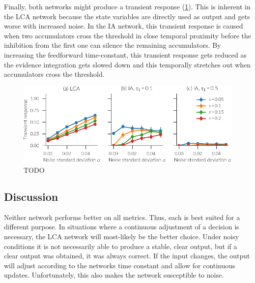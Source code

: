 Finally, both networks might produce a transient response (\cref{fig:ia-transient}).
This is inherent in the LCA network because the state variables are directly used as output and gets worse with increased noise.
In the IA network, this transient response is caused when two accumulators cross the threshold in close temporal proximity before the inhibition from the first one can silence the remaining accumulators.
By increasing the feedforward time-constant, this transient response gets reduced as the evidence integration gets slowed down and this temporally stretches out when accumulators cross the threshold.
\begin{figure}
    \centering
    \includegraphics{figures/ia-transient}
    \caption{TODO}\label{fig:ia-transient}
\end{figure}


\subsection{Discussion}
Neither network performs better on all metrics.
Thus, each is best suited for a different purpose.
In situations where a continuous adjustment of a decision is necessary, the LCA network will most-likely be the better choice.
Under noisy conditions it is not necessarily able to produce a stable, clear output, but if a clear output was obtained, it was always correct.
If the input changes, the output will adjust according to the networks time constant and allow for continuous updates.
Unfortunately, this also makes the network susceptible to noise.


